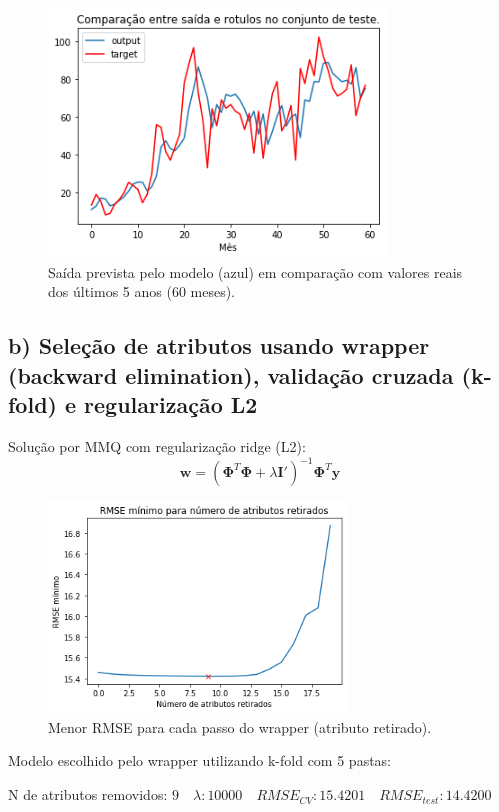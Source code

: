 \documentclass[a4paper, 12pt]{article}
\begin{document}
\begin{figure}[h!]
    \centering
    \includegraphics[width=9cm]{images/raw.png}
    \caption{Saída prevista pelo modelo (azul) em comparação com valores reais dos últimos 5 anos (60 meses).}
\end{figure}

\subsection*{b) Seleção de atributos usando wrapper (backward elimination), validação cruzada (k-fold) e regularização L2}

Solução por MMQ com regularização ridge (L2):
\begin{equation}
    \mathbf{w} = (\boldsymbol{\Phi}^T\boldsymbol{\Phi} + \lambda\mathbf{I'})^{-1}\boldsymbol{\Phi}^T\mathbf{y}
\end{equation}

\begin{figure}[h!]
    \centering
    \includegraphics[width=8cm]{images/backward.png}
    \caption{Menor RMSE para cada passo do wrapper (atributo retirado).}
\end{figure}

Modelo escolhido pelo wrapper utilizando k-fold com 5 pastas:

N de atributos removidos: $9 \quad \lambda: 10000 \quad RMSE_{CV}: 15.4201 \quad RMSE_{test}: 14.4200$
\end{document}
